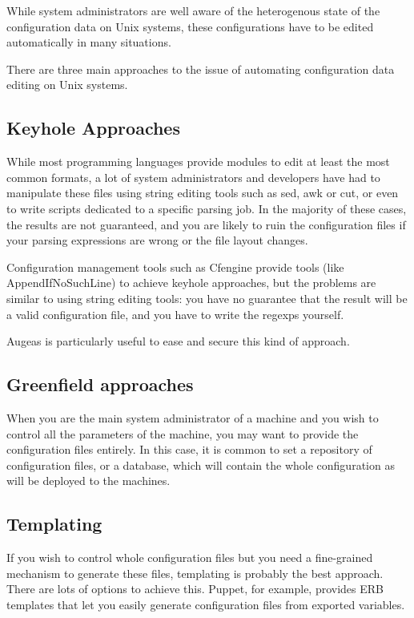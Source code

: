 While system administrators are well aware of the heterogenous state of the configuration data on Unix systems, these configurations have to be edited automatically in many situations.

There are three main approaches to the issue of automating configuration data editing on Unix systems.

\subsection{Keyhole Approaches}

While most programming languages provide modules to edit at least the most common formats, a lot of system administrators and developers have had to manipulate these files using string editing tools such as sed, awk or cut, or even to write scripts dedicated to a specific parsing job. In the majority of these cases, the results are not guaranteed, and you are likely to ruin the configuration files if your parsing expressions are wrong or the file layout changes.

Configuration management tools such as Cfengine provide tools (like AppendIfNoSuchLine) to achieve keyhole approaches, but the problems are similar to using string editing tools: you have no guarantee that the result will be a valid configuration file, and you have to write the regexps yourself.


Augeas is particularly useful to ease and secure this kind of approach.

\subsection{Greenfield approaches}

When you are the main system administrator of a machine and you wish to control all the parameters of the machine, you may want to provide the configuration files entirely. In this case, it is common to set a repository of configuration files, or a database, which will contain the whole configuration as will be deployed to the machines.


\subsection{Templating}

If you wish to control whole configuration files but you need a fine-grained mechanism to generate these files, templating is probably the best approach. There are lots of options to achieve this. Puppet, for example, provides ERB templates that let you easily generate configuration files from exported variables.

